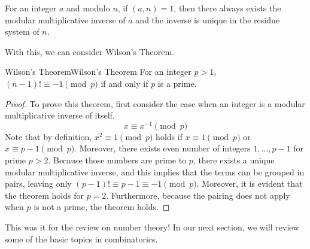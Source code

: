 \documentclass[../../../main.tex]{subfiles}
\begin{document}
\begin{important}
For an integer $a$ and modulo $n$, if $(a, n) = 1$, then there
always exists the modular multiplicative inverse of $a$ and the
inverse is unique in the residue system of $n$.
\end{important}

With this, we can consider Wilson's Theorem.

\begin{theorem}{Wilson's Theorem}{Wilson's Theorem}
For an integer $p > 1$, $(n - 1)! \equiv -1 \pmod{p}$ if and only if
$p$ is a prime.
\end{theorem}
\begin{proof}
To prove this theorem, first consider the case when an integer
is a modular multiplicative inverse of itself.
\[
x \equiv x^{-1} \pmod{p}
\]
Note that by definition, $x^2 \equiv 1 \pmod{p}$ holds if
$x \equiv 1 \pmod{p}$ or $x \equiv p-1 \pmod{p}$. Moreover,
there exists even number of integers $1, \ldots, p-1$ for prime
$p > 2$. Because those numbers are prime to $p$, there exists
a unique modular multiplicative inverse, and this implies that
the terms can be grouped in pairs, leaving only $(p - 1)! \equiv
p - 1 \equiv -1 \pmod{p}$. Moreover, it is evident that the
theorem holds for $p = 2$. Furthermore, because the pairing
does not apply when $p$ is not a prime, the theorem holds.
\end{proof}

This was it for the review on number theory! In our next section,
we will review some of the basic topics in combinatorics.
\end{document}
